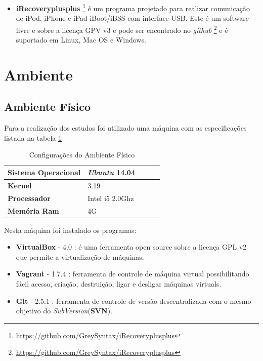 \begin{itemize}
    \item \textbf{iRecoveryplusplus}
\footnote{\url{https://github.com/GreySyntax/iRecoveryplusplus}} é um programa projetado para
 realizar comunicação de iPod, iPhone e iPad iBoot/iBSS  com interface USB. 
Este é um software livre e sobre a licença GPV v3 e pode ser encontrado no \textit{github}
\footnote{\url{https://github.com/GreySyntax/iRecoveryplusplus}} e é suportado em Linux, Mac OS e Windows.

\end{itemize}




\section{Ambiente}

\subsection{Ambiente Físico}

Para a realização dos estudos foi utilizado uma máquina com as
 especificações listada na tabela \ref{configuracoes_ambiente_fisico}

\begin{table}[h]
\centering
\begin{tabular}{lllll}
\textbf{Sistema Operacional} & \textit{Ubuntu} 14.04 \\ \toprule
\textbf{Kernel} & 3.19  \\ \midrule 
\textbf{Processador} & Intel i5 2.0Ghz \\ \midrule
\textbf{Memória Ram} & 4G  \\ \bottomrule 
\end{tabular} 
\caption{Configurações do Ambiente Físico}
\label{configuracoes_ambiente_fisico}
\end{table}


Nesta máquina foi instalado os programas:

\begin{itemize}
    \item \textbf{VirtualBox} - 4.0 : é uma ferramenta open source sobre a
 licença GPL v2 que permite a virtualização de máquinas.
    \item \textbf{Vagrant} - 1.7.4 : ferramenta de controle de
 máquina virtual possibilitando fácil acesso, criação, destruição, ligar e 
desligar máquinas virtuals.
    \item \textbf{Git} - 2.5.1 : ferramenta de controle de versão descentralizada
com o mesmo objetivo do \textit{SubVersion}(\textbf{SVN}).
\end{itemize}

